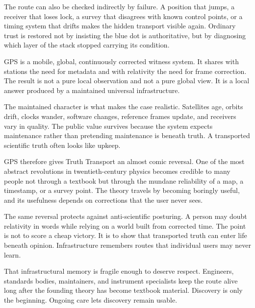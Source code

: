 The route can also be checked indirectly by failure. A position that
jumps, a receiver that loses lock, a survey that disagrees with known
control points, or a timing system that drifts makes the hidden
transport visible again. Ordinary trust is restored not by insisting the
blue dot is authoritative, but by diagnosing which layer of the stack
stopped carrying its condition.

GPS is a mobile, global, continuously corrected witness system. It
shares with stations the need for metadata and with relativity the need
for frame correction. The result is not a pure local observation and not
a pure global view. It is a local answer produced by a maintained
universal infrastructure.

The maintained character is what makes the case realistic. Satellites
age, orbits drift, clocks wander, software changes, reference frames
update, and receivers vary in quality. The public value survives because
the system expects maintenance rather than pretending maintenance is
beneath truth. A transported scientific truth often looks like upkeep.

GPS therefore gives Truth Transport an almost comic reversal. One of the
most abstract revolutions in twentieth-century physics becomes credible
to many people not through a textbook but through the mundane
reliability of a map, a timestamp, or a survey point. The theory travels
by becoming boringly useful, and its usefulness depends on corrections
that the user never sees.

The same reversal protects against anti-scientific posturing. A person
may doubt relativity in words while relying on a world built from
corrected time. The point is not to score a cheap victory. It is to show
that transported truth can enter life beneath opinion. Infrastructure
remembers routes that individual users may never learn.

That infrastructural memory is fragile enough to deserve respect.
Engineers, standards bodies, maintainers, and instrument specialists
keep the route alive long after the founding theory has become textbook
material. Discovery is only the beginning. Ongoing care lets discovery
remain usable.

